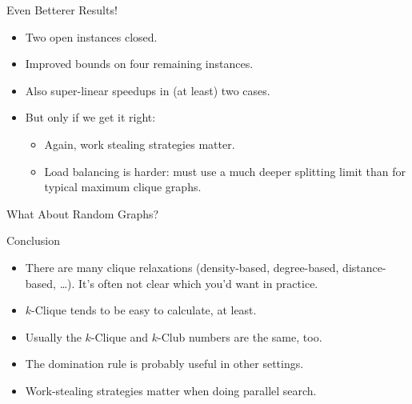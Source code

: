 \documentclass{beamer}
\begin{document}
\begin{frame}{Even Betterer Results!}
    \begin{itemize}
        \item Two open instances closed.
        \item Improved bounds on four remaining instances.
        \item Also super-linear speedups in (at least) two cases.
        \item But only if we get it right:
            \begin{itemize}
                \item Again, work stealing strategies matter.
                \item Load balancing is harder: must use a much deeper splitting limit than for
                    typical maximum clique graphs.
            \end{itemize}
    \end{itemize}
\end{frame}

\begin{frame}{What About Random Graphs?}
    \centering
    
\end{frame}

\begin{frame}{Conclusion}

    \begin{itemize}
        \item There are many clique relaxations (density-based, degree-based, distance-based,
            \ldots). It's often not clear which you'd want in practice.
        \item $k$-Clique tends to be easy to calculate, at least.
        \item Usually the $k$-Clique and $k$-Club numbers are the same, too.
        \item The domination rule is probably useful in other settings.
        \item Work-stealing strategies matter when doing parallel search.
    \end{itemize}
\end{frame}
\end{document}
